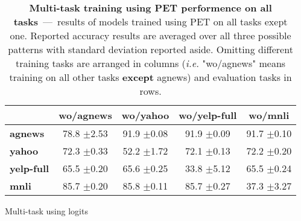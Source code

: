 \begin{table}[h]
	\fontsize{7}{10}
	\selectfont
	\begin{tabular}{lcccc}
		\toprule
		& \textbf{wo/agnews} & \textbf{wo/yahoo} & \textbf{wo/yelp-full} & \textbf{wo/mnli} \\
		\hline
		\textbf{agnews}    & 78.8 \tiny$\pm$2.53        & 91.9 \tiny$\pm$0.08        & 91.9   \tiny$\pm$0.09          & 91.7 \tiny$\pm$0.10       \\
		\textbf{yahoo}     & 72.3 \tiny$\pm$0.33        & 52.2 \tiny$\pm$1.72        & 72.1   \tiny$\pm$0.13          & 72.2 \tiny$\pm$0.20       \\
		\textbf{yelp-full} & 65.5 \tiny$\pm$0.20        & 65.6 \tiny$\pm$0.25        & 33.8   \tiny$\pm$5.12          & 65.5 \tiny$\pm$0.24       \\
		\textbf{mnli}      & 85.7 \tiny$\pm$0.20        & 85.8 \tiny$\pm$0.11        & 85.7   \tiny$\pm$0.27          & 37.3 \tiny$\pm$3.27      \\
		\bottomrule
	\end{tabular}
	\caption{Multi-task using logits}\label{tab:multi-use-logits-summary}
	\caption{\textbf{Multi-task training using PET performence on all tasks}~---~results of models trained using PET on all tasks exept one. Reported accuracy results are averaged over all three possible patterns with standard deviation reported aside. Omitting different training tasks are arranged in columns (\textit{i.e.} "wo/agnews" means training on all other tasks \textbf{except} agnews) and evaluation tasks in rows.}\label{tab:multi-use-logits-summary}
\end{table}